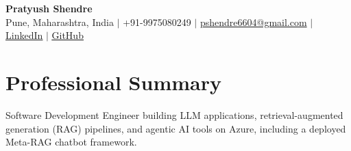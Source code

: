 \documentclass[a4paper,11pt]{article}
\begin{document}
\begin{center}
  {\Large\bfseries Pratyush Shendre}\\[2pt]
  \small Pune, Maharashtra, India $|$ +91-9975080249 $|$
  \href{mailto:pshendre6604@gmail.com}{pshendre6604@gmail.com} $|$
  \href{https://www.linkedin.com/in/pratyush-shendre-2256a7223/}{\underline{LinkedIn}} $|$
  \href{https://github.com/PratyushS04}{\underline{GitHub}}
\end{center}

\section{Professional Summary}
\small Software Development Engineer building LLM applications, retrieval-augmented generation (RAG) pipelines, and agentic AI tools on Azure, including a deployed Meta-RAG chatbot framework.
\end{document}
